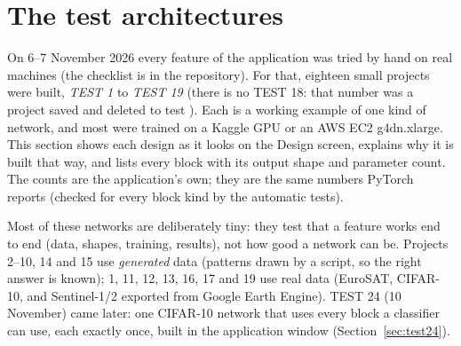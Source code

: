 \section{The test architectures}
\label{sec:tests}

On 6--7 November 2026 every feature of the application was tried by hand on real machines (the checklist is  in the
repository). For that, eighteen small projects were built, \emph{TEST 1} to \emph{TEST 19} (there is no TEST 18: that number was a project
saved and deleted to test ). Each is a working example of one kind of network, and most were trained on a Kaggle GPU or an
AWS EC2 g4dn.xlarge. This section shows each design as it looks on the Design screen, explains why it is built that way, and lists every
block with its output shape and parameter count. The counts are the application's own; they are the same numbers PyTorch reports
(checked for every block kind by the automatic tests).

Most of these networks are deliberately tiny: they test that a feature works end to end (data, shapes, training, results), not how good
a network can be. Projects 2--10, 14 and 15 use \emph{generated} data (patterns drawn by a script, so the right answer is known);
1, 11, 12, 13, 16, 17 and 19 use real data (EuroSAT, CIFAR-10, and Sentinel-1/2 exported from Google Earth Engine).
TEST 24 (10 November) came later: one CIFAR-10 network that uses every block a classifier can use, each exactly once, built in the
application window (Section~\ref{sec:test24}).

